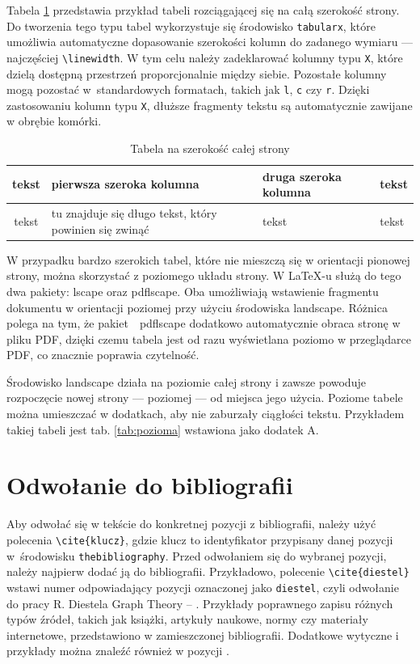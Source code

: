 \documentclass[12pt,a4paper,twoside]{report}
\theoremstyle{definition} %
\begin{document}
	Tabela \ref{tab:szerokosc-tabeli} przedstawia przykład tabeli rozciągającej się na całą szerokość strony. Do tworzenia tego typu tabel wykorzystuje się środowisko \texttt{tabularx}, które umożliwia automatyczne dopasowanie szerokości kolumn do zadanego wymiaru — najczęściej \verb|\linewidth|. W tym celu należy zadeklarować kolumny typu \texttt{X}, które dzielą dostępną przestrzeń proporcjonalnie między siebie. Pozostałe kolumny mogą pozostać w~standardowych formatach, takich jak \texttt{l}, \texttt{c} czy \texttt{r}. Dzięki zastosowaniu kolumn typu \texttt{X}, dłuższe fragmenty tekstu są automatycznie zawijane w obrębie komórki.

    
	\begin{table}[h!]
        \begin{center}
        \caption{Tabela na szerokość całej strony}
		\begin{tabularx}{\linewidth}{|c|X|X|l|}
			\hline
			\hline
			tekst & pierwsza szeroka kolumna & druga szeroka kolumna& tekst\\
			\hline
			tekst & tu znajduje się długo tekst, który powinien się zwinąć & tekst & tekst \\
			\hline
		\end{tabularx}
            \label{tab:szerokosc-tabeli}
        \end{center}
	\end{table}

    W przypadku bardzo szerokich tabel, które nie mieszczą się w orientacji pionowej strony, można skorzystać z poziomego układu strony. W LaTeX-u służą do tego dwa pakiety: lscape oraz pdflscape. Oba umożliwiają wstawienie fragmentu dokumentu w orientacji poziomej przy użyciu środowiska landscape. Różnica polega na tym, że pakiet~~pdflscape dodatkowo automatycznie obraca stronę w pliku PDF, dzięki czemu tabela jest od razu wyświetlana poziomo w przeglądarce PDF, co znacznie poprawia czytelność.
    
    Środowisko landscape działa na poziomie całej strony i zawsze powoduje rozpoczęcie nowej strony — poziomej — od miejsca jego użycia. Poziome tabele można umieszczać w dodatkach, aby nie zaburzały ciągłości tekstu. Przykładem takiej tabeli jest tab. \ref{tab:pozioma} wstawiona jako dodatek A.
    
	\section{Odwołanie do bibliografii}
	
	Aby odwołać się w tekście do konkretnej pozycji z bibliografii, należy użyć polecenia \verb|\cite{klucz}|, gdzie klucz to identyfikator przypisany danej pozycji w~środowisku \texttt{thebibliography}. Przed odwołaniem się do wybranej pozycji, należy najpierw dodać ją do bibliografii. Przykładowo, polecenie \verb|\cite{diestel}| wstawi numer odpowiadający pozycji oznaczonej jako \texttt{diestel}, czyli odwołanie do pracy R. Diestela Graph Theory – \cite{diestel}. Przykłady poprawnego zapisu różnych typów źródeł, takich jak książki, artykuły naukowe, normy czy materiały internetowe, przedstawiono w zamieszczonej bibliografii. Dodatkowe wytyczne i przykłady można znaleźć również w pozycji \cite{internet}.
\end{document}
